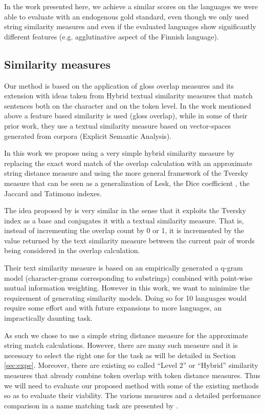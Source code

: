 \documentclass[10pt, a4paper]{article}
\begin{document}
In the work presented here, we achieve a similar scores on the languages we were able to evaluate with an endogenous gold standard, even though we only used string similarity measures and even if the evaluated languages show significantly different features (e.g. agglutinative aspect of the Finnish language).

\subsection{Similarity measures}
Our method is based on the application of gloss overlap measures and its extension with ideas taken from Hybrid textual similarity measures that match sentences both on the character and on the token level. In the work mentioned above \cite{meyer-gurevych:2012:PAPERS} a feature based similarity is used (gloss overlap), while in some of their prior work, \cite{MeyerGurevych:2010}  they use a textual similarity measure based on vector-spaces generated from corpora (Explicit Semantic Analysis).

In this work we propose using a very simple hybrid similarity measure by replacing the exact word match of the overlap calculation with an approximate string distance measure and using the more general framework of the Tversky measure that can be seen as a generalization of Lesk, the Dice coefficient , the Jaccard and Tatimono indexes.

 The idea proposed by \cite{Jimenez2010,Jimenez2012} is very similar in the sense that it exploits the Tversky index as a base and conjugates it with a textual similarity measure. That is, instead of incrementing the overlap count by 0 or 1, it is incremented by the value returned by the text similarity measure between the current pair of words being considered in the overlap calculation.
 
  Their text similarity measure is based on an empirically generated a q-gram model (character-grams corresponding to substrings) combined with point-wise mutual information weighting. However in this work, we want to minimize the requirement of generating similarity models. Doing so for 10 languages would require some effort and with future expansions to more languages, an impractically daunting task. 
 
 As such we chose to use a simple string distance measure for the approximate string match calculations. However, there are many such measure and it is necessary to select the right one for the task as will be detailed in Section \ref{sec:expe}. Moreover, there are existing so called ``Level 2'' or ``Hybrid'' similarity measures that already combine token overlap with token distance measures. Thus we will need to evaluate our proposed method with some of the existing methods so as to evaluate their viability. The various measures and a detailed performance comparison in a name matching task are presented by \cite{Cohen2003}.
\end{document}

